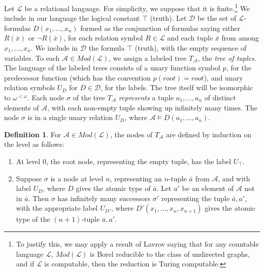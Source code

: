 \documentclass{article}
\theoremstyle{definition}
\newtheorem{defn}[thm]{Definition}
\begin{document}
	Let $\mathcal{L}$ be a relational language. For simplicity, we suppose that it is finite.\footnote{To justify this, we may apply a result of Lavrov \cite{Lavrov} saying that for any countable language $\mathcal{L}$, $Mod(\mathcal{L})$ is Borel reducible to the class of undirected graphs, and if $\mathcal{L}$ is computable, then the reduction is Turing computable.}
We include in our language the logical constant $\top$ (truth). Let $\mathcal{D}$ be the set of $\mathcal{L}$-formulas $D(x_1,\ldots,x_n)$ formed as the conjunction of formulas saying either $R(\bar{x})$ or $\neg{R(\bar{x})}$, for each relation symbol $R\in \mathcal{L}$ and each tuple $\bar{x}$ from among $x_1,\ldots,x_n$. We include in $\mathcal{D}$ the formula $\top$ (truth), with the empty sequence of variables. To each $\mathcal{A}\in Mod(\mathcal{L})$, we assign a labeled tree $T_\mathcal{A}$, the \emph{tree of tuples}. The language of the labeled trees consists of a unary function symbol $p$, for the predecessor function (which has the convention $p(root)=root$), and unary relation symbols $U_D$ for $D\in\mathcal{D}$, for the labels. The tree itself will be isomorphic to $\omega^{<\omega}$. Each node $\sigma$ of the tree $T_\mathcal{A}$ \emph{represents} a tuple $a_1,\ldots,a_n$ of distinct elements of $\mathcal{A}$, with each non-empty tuple showing up infinitely many times. The node $\sigma$ is in a single unary relation $U_D$, where $\mathcal{A}\models D(a_1,\ldots,a_n)$.

\bigskip


	
	\begin{defn}
		
		For $\mathcal{A}\in Mod(\mathcal{L})$, the nodes of $T_\mathcal{A}$ are defined by induction on the level as follows:
		
		\begin{enumerate}
			
			\item At level $0$, the root node, representing the empty tuple, has the label $U_\top$.
			
			\item Suppose $\sigma$ is a node at level $n$, representing an $n$-tuple $\bar{a}$ from $\mathcal{A}$, and with label $U_D$, where $D$ gives the atomic type of $\bar{a}$. Let $a'$ be an element of $\mathcal{A}$ not in $\bar{a}$. Then $\sigma$ has infinitely many successors $\sigma'$ representing the tuple $\bar{a},a'$, with the appropriate label $U_{D'}$, where $D'(x_1,\ldots,x_n,x_{n+1})$ gives the atomic type of the $(n+1)$-tuple $\bar{a},a'$. 
			
		\end{enumerate} 
		
	\end{defn}
	
\end{document}

